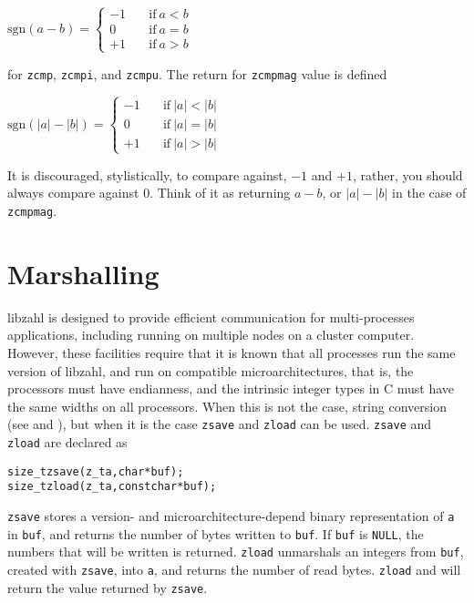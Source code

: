 \vspace{1em}
\(
    \mbox{sgn}(a - b) =
    \left \lbrace \begin{array}{rl}
        -1 & \quad \textrm{if}~a < b \\
         0 & \quad \textrm{if}~a = b \\
        +1 & \quad \textrm{if}~a > b
    \end{array} \right .
\)
\vspace{1em}

\noindent
for {\tt zcmp}, {\tt zcmpi}, and {\tt zcmpu}.
The return for {\tt zcmpmag} value is defined

\vspace{1em}
\(
    \mbox{sgn}(\lvert a \rvert - \lvert b \rvert) =
    \left \lbrace \begin{array}{rl}
        -1 & \quad \textrm{if}~\lvert a \rvert < \lvert b \rvert \\
         0 & \quad \textrm{if}~\lvert a \rvert = \lvert b \rvert \\
        +1 & \quad \textrm{if}~\lvert a \rvert > \lvert b \rvert
    \end{array} \right .
\)
\vspace{1em}

\noindent
It is discouraged, stylistically, to compare
against, $-1$ and $+1$, rather, you should
always compare against $0$. Think of it as
returning $a - b$, or $\lvert a \rvert - \lvert b \rvert$
in the case of {\tt zcmpmag}.


\newpage
\section{Marshalling}
\label{sec:Marshalling}

libzahl is designed to provide efficient communication
for multi-processes applications, including running on
multiple nodes on a cluster computer. However, these
facilities require that it is known that all processes
run the same version of libzahl, and run on compatible
microarchitectures, that is, the processors must have
endianness, and the intrinsic integer types in C must
have the same widths on all processors. When this is not
the case, string conversion (see 
and ), but when it is the case
{\tt zsave} and {\tt zload} can be used. {\tt zsave} and
{\tt zload} are declared as

\begin{alltt}
   size_t zsave(z_t a, char *buf);
   size_t zload(z_t a, const char *buf);
\end{alltt}

\noindent
{\tt zsave} stores a version- and microarchitecture-depend
binary representation of {\tt a} in {\tt buf}, and returns
the number of bytes written to {\tt buf}. If {\tt buf} is
{\tt NULL}, the numbers that will be written is returned.
{\tt zload} unmarshals an integers from {\tt buf}, created
with {\tt zsave}, into {\tt a}, and returns the number of
read bytes. {\tt zload} and will return the value returned
by {\tt zsave}.
